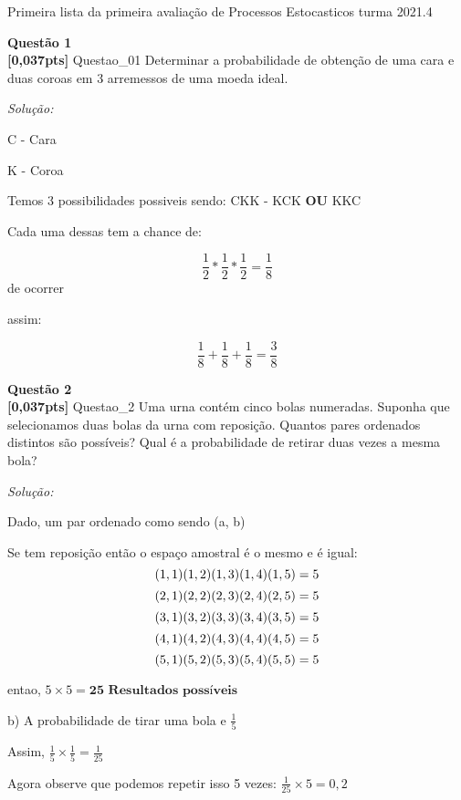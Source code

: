 \documentclass{article}
\newenvironment{problem}[2][Questão]
    { \begin{mdframed}[backgroundcolor=gray!20] \textbf{#1 #2} \\}
    {  \end{mdframed}}
\newenvironment{solution}
    {\textit{Solução:}}
    {}
\begin{document}
\begin{mdframed}[backgroundcolor=blue!20]
Primeira lista da primeira avaliação de Processos Estocasticos turma 2021.4
\end{mdframed}

\begin{problem}{1}
\textbf{[0,037pts]} Questao\_01 Determinar a probabilidade de obtenção de uma cara e duas coroas em 3 arremessos de uma moeda ideal.

\end{problem}

\begin{solution}

C - Cara

K - Coroa

Temos 3 possibilidades possiveis sendo: CKK - KCK \textbf{OU} KKC

Cada uma dessas tem a chance de:

\[\frac{1}{2} * \frac{1}{2}  * \frac{1}{2} = \frac{1}{8}\] de ocorrer

assim:

\[\frac{1}{8} + \frac{1}{8}  + \frac{1}{8} = \frac{3}{8}\]

\end{solution}

\begin{problem}{2}
\textbf{[0,037pts]} Questao\_2 Uma urna contém cinco bolas numeradas. Suponha que selecionamos duas bolas da urna com reposição. Quantos pares ordenados distintos são possíveis? Qual é a probabilidade de retirar duas vezes a mesma bola?

\end{problem}

\begin{solution}

Dado, um par ordenado como sendo (a, b)

Se tem reposição então o espaço amostral é o mesmo e é igual:
\[ (1,1) (1,2) (1,3) (1,4) (1,5) = 5 \newline \]
\[ (2,1) (2,2) (2,3) (2,4) (2,5) = 5 \newline \]
\[ (3,1) (3,2) (3,3) (3,4) (3,5) = 5 \newline \]
\[ (4,1) (4,2) (4,3) (4,4) (4,5) = 5 \newline \]
\[ (5,1) (5,2) (5,3) (5,4) (5,5) = 5 \newline \]

entao, $5 \times 5 = \textbf{25 Resultados possíveis}$


b) A probabilidade de tirar uma bola e $\frac{1}{5}$

Assim, $\frac{1}{5} \times \frac{1}{5} = \frac{1}{25}$

Agora observe que podemos repetir isso 5 vezes: $\frac{1}{25} \times 5 = 0,2$

\end{solution}
\end{document}
